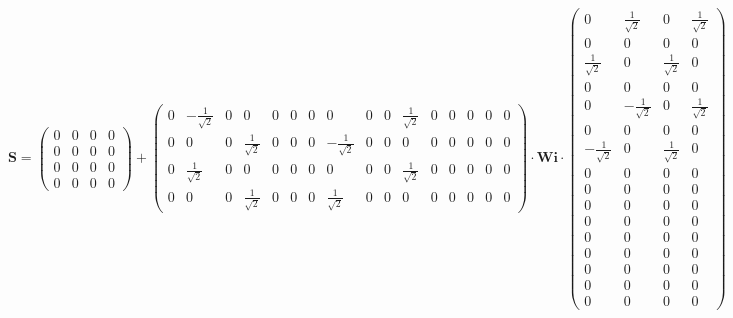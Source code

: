 \[ \mathbf{S} = \left(\begin{array}{cccc} 0 & 0 & 0 & 0 \\ 0 & 0 & 0 &
0 \\ 0 & 0 & 0 & 0 \\ 0 & 0 & 0 & 0 \end{array}\right) +
\left(\begin{array}{cccccccccccccccc} 0 & -\frac{1}{\sqrt{2}} & 0 & 0
& 0 & 0 & 0 & 0 & 0 & 0 & \frac{1}{\sqrt{2}} & 0 & 0 & 0 & 0 & 0 \\ 0
& 0 & 0 & \frac{1}{\sqrt{2}} & 0 & 0 & 0 & -\frac{1}{\sqrt{2}} & 0 & 0
& 0 & 0 & 0 & 0 & 0 & 0 \\ 0 & \frac{1}{\sqrt{2}} & 0 & 0 & 0 & 0 & 0
& 0 & 0 & 0 & \frac{1}{\sqrt{2}} & 0 & 0 & 0 & 0 & 0 \\ 0 & 0 & 0 &
\frac{1}{\sqrt{2}} & 0 & 0 & 0 & \frac{1}{\sqrt{2}} & 0 & 0 & 0 & 0 &
0 & 0 & 0 & 0 \end{array}\right) \cdot \mathbf{Wi}
\cdot\left(\begin{array}{cccc} 0 & \frac{1}{\sqrt{2}} & 0 &
\frac{1}{\sqrt{2}} \\ 0 & 0 & 0 & 0 \\ \frac{1}{\sqrt{2}} & 0 &
\frac{1}{\sqrt{2}} & 0 \\ 0 & 0 & 0 & 0 \\ 0 & -\frac{1}{\sqrt{2}} & 0
& \frac{1}{\sqrt{2}} \\ 0 & 0 & 0 & 0 \\ -\frac{1}{\sqrt{2}} & 0 &
\frac{1}{\sqrt{2}} & 0 \\ 0 & 0 & 0 & 0 \\ 0 & 0 & 0 & 0 \\ 0 & 0 & 0
& 0 \\ 0 & 0 & 0 & 0 \\ 0 & 0 & 0 & 0 \\ 0 & 0 & 0 & 0 \\ 0 & 0 & 0 &
0 \\ 0 & 0 & 0 & 0 \\ 0 & 0 & 0 & 0 \end{array}\right) \]
